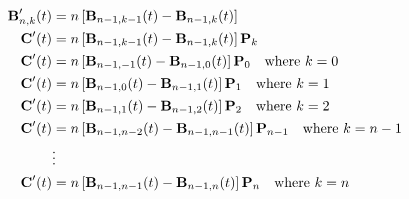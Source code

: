 \documentclass{article}
\begin{document}
\begin{equation}
\begin{aligned} 
    \textbf{B}'_{n,k}(t) &= n \left[ \textbf{B}_{n-1,k-1}(t) - \textbf{B}_{n-1,k}(t) \right] \\
    \textbf{C}'(t)  &= n \left[ \textbf{B}_{n-1,k-1}(t) - \textbf{B}_{n-1,k}(t) \right] \textbf{P}_k \nonumber \\  
    \newline
    \textbf{C}'(t)  &= n \left[ \textbf{B}_{n-1,-1}(t) - \textbf{B}_{n-1,0}(t) \right] \textbf{P}_0 \quad \text{where } k = 0\nonumber \\  
    \textbf{C}'(t)  &= n \left[ \textbf{B}_{n-1,0}(t) - \textbf{B}_{n-1,1}(t) \right] \textbf{P}_1 \quad \text{where } k = 1\nonumber \\  
    \textbf{C}'(t)  &= n \left[ \textbf{B}_{n-1,1}(t) - \textbf{B}_{n-1,2}(t) \right] \textbf{P}_2 \quad \text{where } k = 2\nonumber \\  
    \textbf{C}'(t)  &= n \left[ \textbf{B}_{n-1,n-2}(t) - \textbf{B}_{n-1,n-1}(t) \right] \textbf{P}_{n-1} \quad \text{where } k = n-1\nonumber \\  
                    &\vdots \\
    \textbf{C}'(t)  &= n \left[ \textbf{B}_{n-1,n-1}(t) - \textbf{B}_{n-1,n}(t) \right] \textbf{P}_{n} \quad \text{where } k = n\nonumber \\  
\end{aligned} 
\end{equation}
\end{document}

